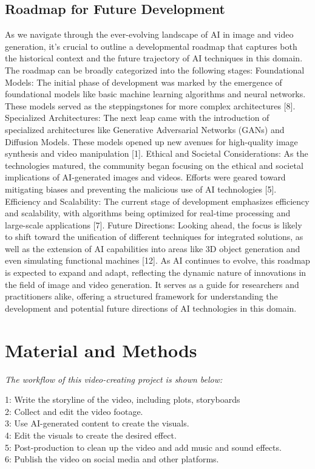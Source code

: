 \documentclass[11pt,a4paper,oneside]{report}
\newcommand{\instructions}[1]{{\color{black}\itshape #1}}
\begin{document}
\section{Roadmap for Future Development}
As we navigate through the ever-evolving landscape of AI in image and video generation, it's crucial to outline a developmental roadmap that captures both the historical context and the future trajectory of AI techniques in this domain. The roadmap can be broadly categorized into the following stages: Foundational Models: The initial phase of development was marked by the emergence of foundational models like basic machine learning algorithms and neural networks. These models served as the steppingstones for more complex architectures [8]. 
Specialized Architectures: The next leap came with the introduction of specialized architectures like Generative Adversarial Networks (GANs) and Diffusion Models. These models opened up new avenues for high-quality image synthesis and video manipulation [1]. 
Ethical and Societal Considerations: As the technologies matured, the community began focusing on the ethical and societal implications of AI-generated images and videos. Efforts were geared toward mitigating biases and preventing the malicious use of AI technologies [5]. 
Efficiency and Scalability: The current stage of development emphasizes efficiency and scalability, with algorithms being optimized for real-time processing and large-scale applications [7]. 
Future Directions: Looking ahead, the focus is likely to shift toward the unification of different techniques for integrated solutions, as well as the extension of AI capabilities into areas like 3D object generation and even simulating functional machines [12]. 
As AI continues to evolve, this roadmap is expected to expand and adapt, reflecting the dynamic nature of innovations in the field of image and video generation. It serves as a guide for researchers and practitioners alike, offering a structured framework for understanding the development and potential future directions of AI technologies in this domain. 



\chapter{Material and Methods}
\label{material-and-methods}

\instructions{The workflow of this video-creating project is shown below:

1: Write the storyline of the video, including plots, storyboards \\
2: Collect and edit the video footage.\\
3: Use AI-generated content to create the visuals. \\
4: Edit the visuals to create the desired effect. \\
5: Post-production to clean up the video and add music and sound effects. \\
6: Publish the video on social media and other platforms. \\
}
\end{document}
